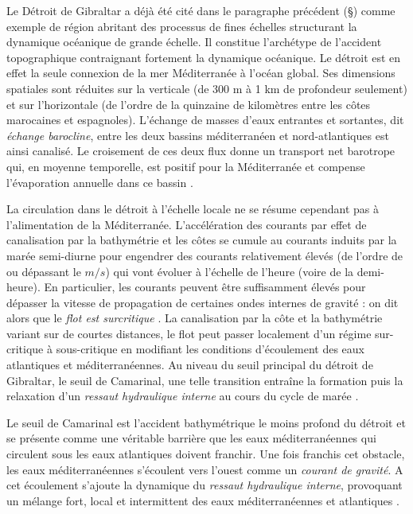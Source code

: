 Le Détroit de Gibraltar a déjà été cité dans le paragraphe précédent (\S {}) comme exemple de région abritant des processus de fines échelles structurant la dynamique océanique de grande échelle. Il constitue l'archétype de l'accident topographique contraignant fortement la dynamique océanique. Le détroit est en effet la seule connexion de la mer Méditerranée à l'océan global. Ses dimensions spatiales sont réduites sur la verticale (de 300 m à 1 km de profondeur seulement) et sur l'horizontale (de l'ordre de la quinzaine de kilomètres entre les côtes marocaines et espagnoles). L'échange de masses d'eaux entrantes et sortantes, dit \textit{échange barocline}, entre les deux bassins méditerranéen et nord-atlantiques est ainsi canalisé. Le croisement de ces deux flux donne un transport net barotrope qui, en moyenne temporelle, est positif pour la Méditerranée et compense l'évaporation annuelle dans ce bassin \citep{Bryden94}.

La circulation dans le détroit à l'échelle locale ne se résume cependant pas à l'alimentation de la Méditerranée. L'accélération des courants par effet de canalisation par la bathymétrie et les côtes se cumule au courants induits par la marée semi-diurne pour engendrer des courants relativement élevés (de l'ordre de ou dépassant le $m/s$) qui vont évoluer à l'échelle de l'heure (voire de la demi-heure). En particulier, les courants peuvent être suffisamment élevés pour dépasser la vitesse de propagation de certaines ondes internes de gravité : on dit alors que le \textit{flot est surcritique} \citep{Baines1995}. La canalisation par la côte et la bathymétrie variant sur de courtes distances, le flot peut passer localement d'un régime sur-critique à sous-critique en modifiant les conditions d'écoulement des eaux atlantiques et méditerranéennes. Au niveau du seuil principal du détroit de Gibraltar, le seuil de Camarinal, une telle transition entraîne la formation puis la relaxation d'un \textit{ressaut hydraulique interne} au cours du cycle de marée \citep{FA1988}.

Le seuil de Camarinal est l'accident bathymétrique le moins profond du détroit et se présente comme une véritable barrière que les eaux méditerranéennes qui circulent sous les eaux atlantiques doivent franchir. Une fois franchis cet obstacle, les eaux méditerranéennes s'écoulent vers l'ouest comme un \textit{courant de gravité}. A cet écoulement s'ajoute la dynamique du \textit{ressaut hydraulique interne}, provoquant un mélange fort, local et intermittent des eaux méditerranéennes et atlantiques \citep{wesson_1994,GarciaLafuente2011}.


